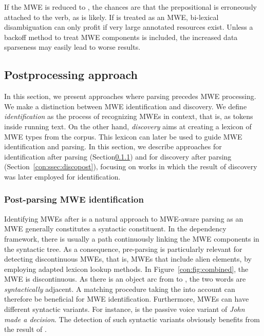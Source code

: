 \documentclass[output=paper]{langsci/langscibook}
\begin{document}
If the MWE  is reduced to , the chances are that the prepositional  is erroneously attached to the verb, as  is likely. If  is treated as an MWE, bi-lexical disambiguation can only profit if very large annotated resources exist. Unless a backoff method to treat MWE components is included, the increased data sparseness may easily lead to worse results.



\subsection{Postprocessing approach}
\label{con:ssec:postproc}

In this section, we present approaches where parsing precedes MWE processing. We make a distinction between MWE identification and discovery. We define \emph{identification} as the process of recognizing MWEs in context, that is, as tokens inside running text. On the other hand, \emph{discovery} aims at creating a lexicon of MWE types from the corpus. This lexicon can later be used to guide MWE identification and parsing. In this section, we describe approaches for identification after parsing (Section\ref{con:ssec:idpost}) and for discovery after parsing (Section~\ref{con:ssec:discopost}), focusing on works in which the result of discovery was later employed for identification.




\subsubsection{Post-parsing MWE identification}
\label{con:ssec:idpost}

Identifying MWEs after  is a natural approach to MWE-aware parsing as an MWE generally constitutes a syntactic constituent. In the dependency framework, there is usually a path continuously linking the MWE components in the syntactic tree. As a consequence, pre-parsing is particularly relevant for detecting discontinuous MWEs, that is, MWEs that include alien elements, by employing adapted lexicon lookup methods. In Figure~\ref{con:fig:combined}, the MWE  is discontinuous. As there is an object arc from  to , the two words are \emph{syntactically} adjacent. A matching procedure taking the  into account can therefore be beneficial for MWE identification. 
Furthermore, MWEs can have different syntactic variants. For instance,  is the passive voice variant of \textit{John made a decision}. The detection of such syntactic variants obviously benefits from the result of . 
\end{document}
